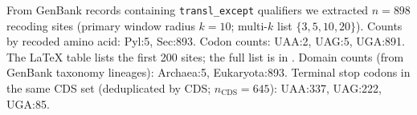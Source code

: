 From GenBank records containing \texttt{transl\_except} qualifiers we extracted $n=898$ recoding sites (primary window radius $k=10$; multi-$k$ list $\{3,5,10,20\}$). Counts by recoded amino acid: Pyl:5, Sec:893. Codon counts: UAA:2, UAG:5, UGA:891.
The LaTeX table lists the first 200 sites; the full list is in .
Domain counts (from GenBank taxonomy lineages): Archaea:5, Eukaryota:893.
Terminal stop codons in the same CDS set (deduplicated by CDS; $n_\mathrm{CDS}=645$): UAA:337, UAG:222, UGA:85.
